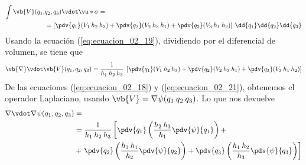 \begin{align}
\begin{aligned}
\int \vb{V}(q_{1}, & q_{2}, q_{3}) \vdot \vu*{\sigma} =  \\
&= \left[ \pdv{q_{1}} (V_{1} \: h_{2} \: h_{3}) + \pdv{q_{2}} (V_{2} \: h_{3} \: h_{1}) +
\pdv{q_{3}} (V_{3} \: h_{1} \: h_{2}) \right] \: \dd{q_{1}} \dd{q_{2}} \dd{q_{3}}
\end{aligned}
\end{align}
Usando la ecuación (\ref{eq:ecuacion_02_19}), dividiendo por el diferencial de volumen, se tiene que
\begin{equation}
\vb{\nabla} \vdot \vb{V}(q_{1}, q_{2}, q_{3}) = \dfrac{1}{h_{1} \: h_{2} \: h_{3}} \; \left[ \pdv{q_{1}} (V_{1} \: h_{2} \: h_{3}) + \pdv{q_{2}} (V_{2} \: h_{3} \: h_{1}) + \pdv{q_{3}} (V_{3} \: h_{1} \: h_{2})   \right]
\label{eq:ecuacion_02_21}
\end{equation}
De las ecuaciones (\ref{eq:ecuacion_02_18}) y (\ref{eq:ecuacion_02_21}), obtenemos el operador Laplaciano, usando $\vb{V} = \nabla \psi(q_{1} \: q_{2}\:  q_{3})$. Lo que nos devuelve
\begin{align}
\begin{aligned}
\nabla \vdot \nabla \psi (q_{1}, q_{2}, q_{3}) &= \\
&= \dfrac{1}{h_{1} \: h_{2} \: h_{3}} \left[ \pdv{q_{1}} \left( \dfrac{h_{2} \: h_{3}}{h_{1}} \pdv{\psi}{q_{1}} \right) + \right. \\
&+ \left.  \pdv{q_{2}} \left( \dfrac{h_{3} \: h_{1}}{h_{2}} \pdv{ \psi}{q_{2}} \right) + \pdv{q_{3}} \left( \dfrac{h_{1} \: h_{2}}{h_{3}} \pdv{\psi}{q_{3}} \right) \right]  
\end{aligned}
\label{eq:ecuacion_02_22}
\end{align}
